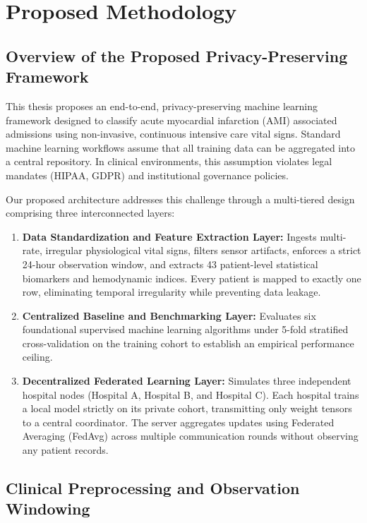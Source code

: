 \chapter{Proposed Methodology}
\label{ch:methodology}

\section{Overview of the Proposed Privacy-Preserving Framework}
\label{sec:method_overview}

This thesis proposes an end-to-end, privacy-preserving machine learning framework designed to classify acute myocardial infarction (AMI) associated admissions using non-invasive, continuous intensive care vital signs. Standard machine learning workflows assume that all training data can be aggregated into a central repository. In clinical environments, this assumption violates legal mandates (HIPAA, GDPR) and institutional governance policies. 

Our proposed architecture addresses this challenge through a multi-tiered design comprising three interconnected layers:
\begin{enumerate}
    \item \textbf{Data Standardization and Feature Extraction Layer:} Ingests multi-rate, irregular physiological vital signs, filters sensor artifacts, enforces a strict 24-hour observation window, and extracts 43 patient-level statistical biomarkers and hemodynamic indices. Every patient is mapped to exactly one row, eliminating temporal irregularity while preventing data leakage.
    \item \textbf{Centralized Baseline and Benchmarking Layer:} Evaluates six foundational supervised machine learning algorithms under 5-fold stratified cross-validation on the training cohort to establish an empirical performance ceiling.
    \item \textbf{Decentralized Federated Learning Layer:} Simulates three independent hospital nodes (Hospital A, Hospital B, and Hospital C). Each hospital trains a local model strictly on its private cohort, transmitting only weight tensors to a central coordinator. The server aggregates updates using Federated Averaging (FedAvg) across multiple communication rounds without observing any patient records.
\end{enumerate}

\section{Clinical Preprocessing and Observation Windowing}
\label{sec:preprocessing_windowing}

